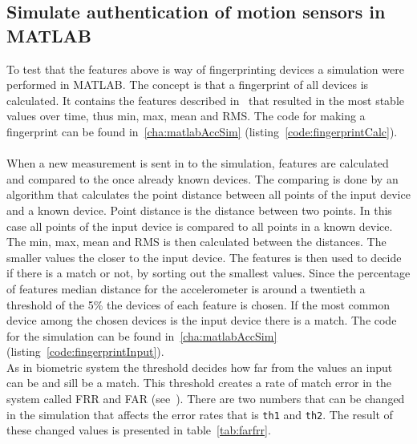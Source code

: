 \subsection{Simulate authentication of motion sensors in MATLAB}
To test that the features above is way of fingerprinting devices a simulation were performed in MATLAB. The concept is that a fingerprint of all devices is calculated. It contains the features described in~ that resulted in the most stable values over time, thus min, max, mean and RMS. The code for making a fingerprint can be found in~\ref{cha:matlabAccSim} (listing~\ref{code:fingerprintCalc}).\\
\\
When a new measurement is sent in to the simulation, features are calculated and compared to the once already known devices. The comparing is done by an algorithm that calculates the point distance between all points of the input device and a known device. Point distance is the distance between two points. In this case all points of the input device is compared to all points in a known device. \\
The min, max, mean and RMS is then calculated between the distances. The smaller values the closer to the input device. 
The features is then used to decide if there is a match or not, by sorting out the smallest values. Since the percentage of features median distance for the accelerometer is around a twentieth a threshold of the 5\% the devices of each feature is chosen. If the most common device among the chosen devices is the input device there is a match. The code for the simulation can be found in~\ref{cha:matlabAccSim} (listing~\ref{code:fingerprintInput}).\\
As in biometric system the threshold decides how far from the values an input can be and sill be a match. This threshold creates a rate of match error in the system called FRR and FAR (see~). There are two numbers that can be changed in the simulation that affects the error rates that is  \texttt{th1} and \texttt{th2}. The result of these changed values is presented in table~\ref{tab:farfrr}.

